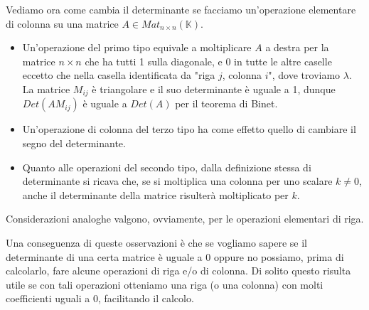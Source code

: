 Vediamo ora come cambia il determinante se facciamo un'operazione elementare di colonna
su una matrice $A \in Mat_{n \times n}(\mathbb{K})$.
\begin{itemize}
	\item Un'operazione del primo tipo equivale a moltiplicare $A$ a destra per la
	      matrice $n \times n$ che ha tutti 1 sulla diagonale, e 0 in tutte le altre
	      caselle eccetto che nella casella identificata da "riga $j$, colonna $i$",
	      dove troviamo $\lambda$. La matrice $M_{ij}$ \`e triangolare e il suo
	      determinante \`e uguale a 1, dunque $Det(AM_{ij})$ \`e uguale a $Det(A)$ per
	      il teorema di Binet.
	\item Un'operazione di colonna del terzo tipo ha come
	      effetto quello di cambiare il segno del determinante.
	\item Quanto alle operazioni del secondo tipo, dalla definizione stessa di
	      determinante si ricava che, se si moltiplica una colonna per uno scalare
	      $k \neq 0$, anche il determinante della matrice risulter\`a moltiplicato
	      per $k$.
\end{itemize}

Considerazioni analoghe valgono, ovviamente, per le operazioni elementari di
riga.

Una conseguenza di queste osservazioni \`e che se vogliamo sapere se il
determinante di una certa matrice \`e uguale a 0 oppure no possiamo,
prima di calcolarlo, fare alcune operazioni di riga e/o di colonna.
Di solito questo risulta utile se con tali operazioni otteniamo una riga
(o una colonna) con molti coefficienti uguali a 0, facilitando il calcolo.